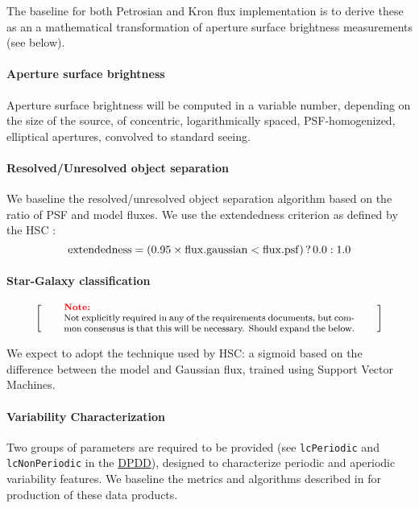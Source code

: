 \documentclass[12pt]{article}
\newcommand{\ds}[2]{{\color{blue} \href{https://docushare.lsstcorp.org/docushare/dsweb/Get/#1}{#2}}\xspace}
\newcommand{\DPDD}{\ds{LSE-163}{DPDD}}
\newenvironment{note}[1][Note]
{
  \begin{displaymath}
    \left[ \qquad
    \begin{minipage}[h]{.75\linewidth}
      \color{red} \footnotesize
      \textbf{#1:} \newline
      \color{black}
}
{
    \end{minipage}
    \normalsize
    \qquad \right]
  \end{displaymath}
}
\begin{document}
The baseline for both Petrosian and Kron flux implementation is to derive these as an a mathematical transformation of aperture surface brightness measurements (see below).

\paragraph{Aperture surface brightness} Aperture surface brightness will be computed in a variable number, depending on the size of the source, of concentric, logarithmically spaced, PSF-homogenized, elliptical apertures, convolved to standard seeing.

\paragraph{Resolved/Unresolved object separation}
\label{alg:star-galaxy}

We baseline the resolved/unresolved object separation algorithm based on the ratio of PSF and model fluxes. We use the extendedness criterion as defined by the HSC \cite{Furusawa14}:
\begin{equation}
{\rm extendedness} = (0.95\times {\rm flux.gaussian} < {\rm flux.psf})\, ?\, 0.0 : 1.0 \nonumber
\end{equation}

\paragraph{Star-Galaxy classification}

\begin{note}
Not explicitly required in any of the requirements documents, but common consensus is that this will be necessary. Should expand the below.
\end{note}

We expect to adopt the technique used by HSC\@: a sigmoid based on the difference between the model and Gaussian flux, trained using Support Vector Machines.

\paragraph{Variability Characterization}

Two groups of parameters are required to be provided (see {\tt lcPeriodic} and {\tt lcNonPeriodic} in the \DPDD), designed to characterize periodic and aperiodic variability features. We baseline the metrics and algorithms described in \cite{Richards11} for production of these data products.
\end{document}
